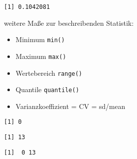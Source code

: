 \documentclass[
  letterpaper,
  DIV=11,
  numbers=noendperiod]{scrartcl}
\newenvironment{Shaded}{\begin{snugshade}}{\end{snugshade}}
\newcommand{\FunctionTok}[1]{\textcolor[rgb]{0.28,0.35,0.67}{#1}}
\newcommand{\NormalTok}[1]{\textcolor[rgb]{0.00,0.23,0.31}{#1}}
\newcommand{\SpecialCharTok}[1]{\textcolor[rgb]{0.37,0.37,0.37}{#1}}
\providecommand{\tightlist}{%
  \setlength{\itemsep}{0pt}\setlength{\parskip}{0pt}}\usepackage{longtable,booktabs,array}
\begin{document}
\begin{verbatim}
[1] 0.1042081
\end{verbatim}

weitere Maße zur beschreibenden Statistik:

\begin{itemize}
\tightlist
\item
  Minimum \texttt{min()}
\item
  Maximum \texttt{max()}
\item
  Wertebereich \texttt{range()}
\item
  Quantile \texttt{quantile()}
\item
  Varianzkoeffizient = CV = sd/mean
\end{itemize}

\begin{Shaded}
\end{Shaded}

\begin{verbatim}
[1] 0
\end{verbatim}

\begin{Shaded}
\end{Shaded}

\begin{verbatim}
[1] 13
\end{verbatim}

\begin{Shaded}
\end{Shaded}

\begin{verbatim}
[1]  0 13
\end{verbatim}

\begin{Shaded}
\end{Shaded}
\end{document}
